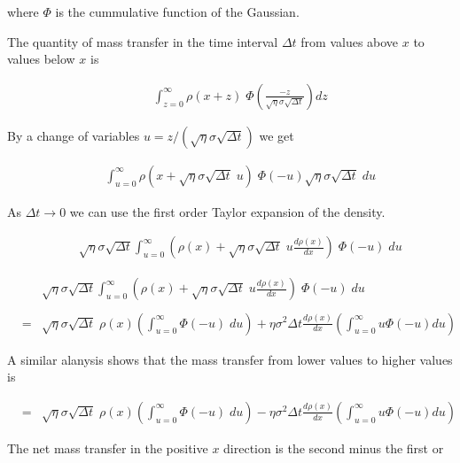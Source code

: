 {{\vfill
where $\Phi$ is the cummulative function of the Gaussian.
}

{\Large

The quantity of mass transfer in the time interval $\Delta t$ from values above $x$ to values below $x$ is


\begin{eqnarray*}
&  & \int_{z = 0}^\infty \rho(x+z)\;\Phi\left(\frac{-z}{\sqrt{\eta}\sigma\sqrt{\Delta t}}\right) dz
\end{eqnarray*}

By a change of variables $u = z/(\sqrt{\eta}\sigma\sqrt{\Delta t})$ we get

\begin{eqnarray*}
&  & \int_{u = 0}^\infty \rho(x+\sqrt{\eta}\sigma\sqrt{\Delta t}\;u)\;\Phi(-u) \sqrt{\eta}\sigma\sqrt{\Delta t}\;du
\end{eqnarray*}

\vfill
As $\Delta t \rightarrow 0$ we can use the first order Taylor expansion of the density.

\begin{eqnarray*}
&  & \sqrt{\eta}\sigma\sqrt{\Delta t} \int_{u = 0}^\infty \left(\rho(x)+\sqrt{\eta}\sigma\sqrt{\Delta t}\;u \frac{d\rho(x)}{dx}\right)\;\Phi(-u)\;du
\end{eqnarray*}
}

{\Large

\begin{eqnarray*}
&  & \sqrt{\eta}\sigma\sqrt{\Delta t} \int_{u = 0}^\infty \left(\rho(x)+\sqrt{\eta}\sigma\sqrt{\Delta t}\;u \frac{d\rho(x)}{dx}\right)\;\Phi(-u)\;du \\
\\
& = & \sqrt{\eta}\sigma\sqrt{\Delta t}\;\rho(x)\left(\int_{u=0}^\infty \Phi(-u)\;du\right) +  \eta\sigma^2\Delta t \frac{d\rho(x)}{dx} \left(\int_{u=0}^\infty u\Phi(-u) du\right)
\end{eqnarray*}

A similar alanysis shows that the mass transfer from lower values to higher values is

\begin{eqnarray*}
& = & \sqrt{\eta}\sigma\sqrt{\Delta t}\;\rho(x)\left(\int_{u=0}^\infty \Phi(-u)\;du\right) -  \eta\sigma^2\Delta t \frac{d\rho(x)}{dx} \left(\int_{u=0}^\infty u\Phi(-u) du\right)
\end{eqnarray*}

\vfill
The net mass transfer in the positive $x$ direction is the second minus the first or

}}
